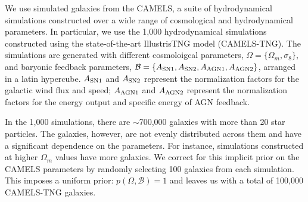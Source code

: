 We use simulated galaxies from the CAMELS, a suite of hydrodynamical
simulations constructed over a wide range of cosmological and
hydrodynamical parameters.
In particular, we use the 1,000 hydrodynamical simulations constructed using
the state-of-the-art IllustrisTNG model (CAMELS-TNG). 
The simulations are generated with different cosmoloigcal parameters,
$\Omega = \{\Omega_m, \sigma_8\}$, and baryonic feedback parameters, 
$\mathcal{B} = \{A_{\rm SN1}, A_{\rm SN2}, A_{\rm AGN1}, A_{\rm AGN2}\}$,
arranged in a latin hypercube. 
$A_{\rm SN1}$ and $A_{\rm SN2}$ represent the normalization factors for the 
galactic wind flux and speed; 
$A_{\rm AGN1}$ and $A_{\rm AGN2}$ represent the normalization factors for the 
energy output and specific energy of AGN feedback.

In the 1,000 simulations, there are $\sim$700,000 galaxies with more than 20
star particles. 
The galaxies, however, are not evenly distributed across them and have a
significant dependence on the parameters.  
For instance, simulations constructed at higher $\Omega_m$ values have more
galaxies.  
We correct for this implicit prior on the CAMELS parameters by randomly
selecting 100 galaxies from each simulation. 
This imposes a uniform prior: $p(\Omega, \mathcal{B}) = 1$ and leaves us with 
a total of 100,000 CAMELS-TNG galaxies.  


